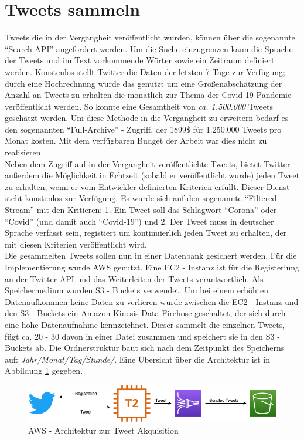 \section{Tweets sammeln}
\label{sec:tweets-sammeln}
Tweets die in der Vergangheit veröffentlicht wurden, können über die sogenannte "`Search API"' angefordert werden. Um die Suche einzugrenzen kann die Sprache der Tweets und im Text vorkommende Wörter sowie ein Zeitraum definiert werden. 
Konstenlos stellt Twitter die Daten der letzten 7 Tage zur Verfügung; durch eine Hochrechnung wurde das genutzt um eine Größenabschätzung der Anzahl an Tweets zu erhalten die monatlich zur Thema der Covid-19 Pandemie veröffentlicht werden.
So konnte eine Gesamtheit von \textit{ca. 1.500.000} Tweets geschätzt werden. 
Um diese Methode in die Vergangheit zu erweitern bedarf es den sogenannten "`Full-Archive"' - Zugriff, der 1899\$ für 1.250.000 Tweets pro Monat kosten. Mit dem verfügbaren Budget der Arbeit war dies nicht zu realisieren.\\ \newline
Neben dem Zugriff auf in der Vergangheit veröffentlichte Tweets, bietet Twitter außerdem die Möglichkeit in Echtzeit (sobald er veröffentlicht wurde) jeden Tweet zu erhalten, wenn er vom Entwickler definierten Kriterien erfüllt.
Dieser Dienst steht konstenlos zur Verfügung.
Es wurde sich auf den sogenannte "`Filtered Stream"' mit den Kritieren: 1. Ein Tweet soll das Schlagwort "`Corona"' oder "`Covid"' (und damit auch "`Covid-19"') und 2. Der Tweet muss in deutscher Sprache verfasst sein, registiert um kontinuierlich jeden Tweet zu erhalten, der mit diesen Kriterien veröffentlicht wird. \\ \newline
Die gesammelten Tweets sollen nun in einer Datenbank gesichert werden. 
Für die Implementierung wurde \ac{AWS} genutzt. Eine \gls{EC2 - Instanz} ist für die Registeriung an der Twitter API und das Weiterleiten der Tweets verantwortlich. Als Speichermedium wurden \glspl{S3 - Bucket} verwendet. Um bei einem erhöhten Datenaufkommen keine Daten zu verlieren wurde zwischen die \gls{EC2 - Instanz} und den \glspl{S3 - Bucket} ein \gls{Amazon Kinesis Data Firehose} geschaltet, der sich durch eine hohe Datenaufnahme kennzeichnet. 
Dieser sammelt die einzelnen Tweets, fügt ca. 20 - 30 davon in einer Datei zusammen und speichert sie in den \glspl{S3 - Bucket} ab. 
Die Ordnerstruktur baut sich nach dem Zeitpunkt des Speicherns auf: \textit{Jahr/Monat/Tag/Stunde/}.
Eine Übersicht über die Architektur ist in Abbildung \ref{fig:aws-architecture} gegeben.
\begin{figure}[h]
	\centering
	\includegraphics[width=0.7\linewidth]{images/AWS-architecture}
	\caption{\ac{AWS} - Architektur zur Tweet Akquisition}
	\label{fig:aws-architecture}
\end{figure}


